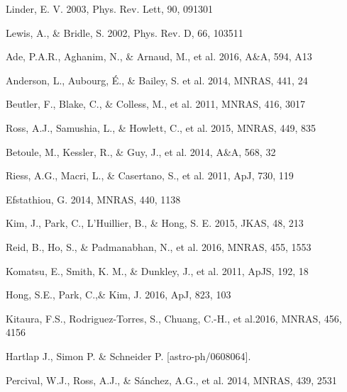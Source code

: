 \documentclass{natureprintstyle}
\begin{document}
\begin{thebibliography}{10}
Linder, E. V. 2003, Phys. Rev. Lett, 90, 091301

Lewis, A., \& Bridle, S. 2002, Phys. Rev. D, 66, 103511

Ade, P.A.R., Aghanim, N., \& Arnaud, M., et al. 2016, A\&A, 594, A13 

Anderson, L., Aubourg, \'E., \& Bailey, S. et al. 2014, MNRAS, 441, 24 

Beutler, F., Blake, C., \& Colless, M., et al. 2011, MNRAS, 416, 3017

Ross, A.J., Samushia, L., \& Howlett, C., et al. 2015, MNRAS, 449, 835

Betoule, M., Kessler, R., \& Guy, J., et al. 2014, A\&A, 568, 32

Riess, A.G., Macri, L., \& Casertano, S., et al. 2011, ApJ, 730, 119

Efstathiou, G. 2014, MNRAS, 440, 1138

Kim, J., Park, C., L'Huillier, B., \& Hong, S. E. 2015, JKAS, 48, 213




Reid, B., Ho, S., \& Padmanabhan, N., et al.  2016, MNRAS, 455, 1553

Komatsu, E., Smith, K. M., \& Dunkley, J., et al. 2011, ApJS, 192, 18  

Hong, S.E., Park, C.,\&  Kim, J. 2016, ApJ, 823, 103

Kitaura, F.S., Rodriguez-Torres, S., Chuang, C.-H., et al.2016, MNRAS, 456, 4156

Hartlap J., Simon P. \& Schneider P. [astro-ph/0608064].

Percival, W.J., Ross, A.J., \& S\'{a}nchez, A.G., et al. 2014, MNRAS, 439, 2531

\end{thebibliography}
\end{document}
